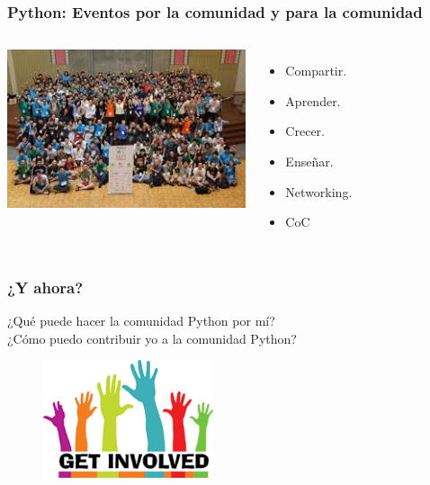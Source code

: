 \documentclass[18pt]{beamer}
\begin{document}
\begin{frame}

	\frametitle{Python: Eventos por la comunidad y para la comunidad}
	\begin{columns}
		\centering
			\includegraphics[width=7cm]{images/ejemplo_pycon.jpeg}\\
			
		\begin{itemize}
			\setlength\itemsep{0.6em}		
			\item Compartir.
			\item Aprender.
			\item Crecer.
			\item Enseñar.
			\item Networking.
			\item CoC

		\end{itemize}
	\end{columns}
	
	
\end{frame}


\begin{frame}

	\frametitle{¿Y ahora?}
	
	\begin{center}
		\Large ¿Qué puede hacer la comunidad Python por mí?\\
		\vspace{0.5cm}
		\Large ¿Cómo puedo contribuir yo a la comunidad Python?
	\end{center}
	
	\begin{figure}
		\includegraphics[width=5cm]{images/get_involved.png}
	\end{figure}
	
\end{frame}
\end{document}
